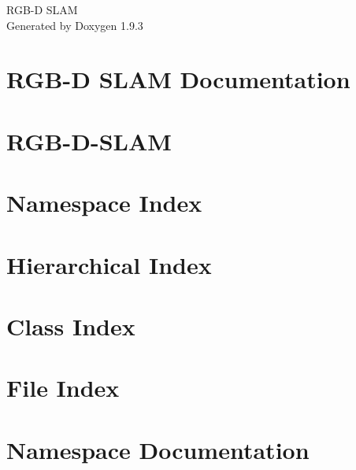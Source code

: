 \documentclass[twoside]{book}
\newcommand{\+}{\discretionary{\mbox{\scriptsize$\hookleftarrow$}}{}{}}
\newcommand{\clearemptydoublepage}{%
    \newpage{\pagestyle{empty}\cleardoublepage}%
  }
\begin{document}
  \raggedbottom
    \hypersetup{pageanchor=false,
                bookmarksnumbered=true,
                pdfencoding=unicode
               }
  \begin{titlepage}
  \vspace*{7cm}
  \begin{center}%
  {\Large RGB-\/\+D SLAM}\\
  \vspace*{1cm}
  {\large Generated by Doxygen 1.9.3}\\
  \end{center}
  \end{titlepage}
  \clearemptydoublepage
  \tableofcontents
  \clearemptydoublepage
  \hypersetup{pageanchor=true}
\chapter{RGB-\/D SLAM Documentation}
\label{index}\hypertarget{index}{}
\chapter{RGB-\/\+D-\/\+SLAM}
\label{md__home_baptou__documents_code_robots__r_g_b__s_l_a_m__r_g_b__d__s_l_a_m__r_e_a_d_m_e}

\chapter{Namespace Index}

\chapter{Hierarchical Index}

\chapter{Class Index}

\chapter{File Index}

\chapter{Namespace Documentation}








\end{document}
